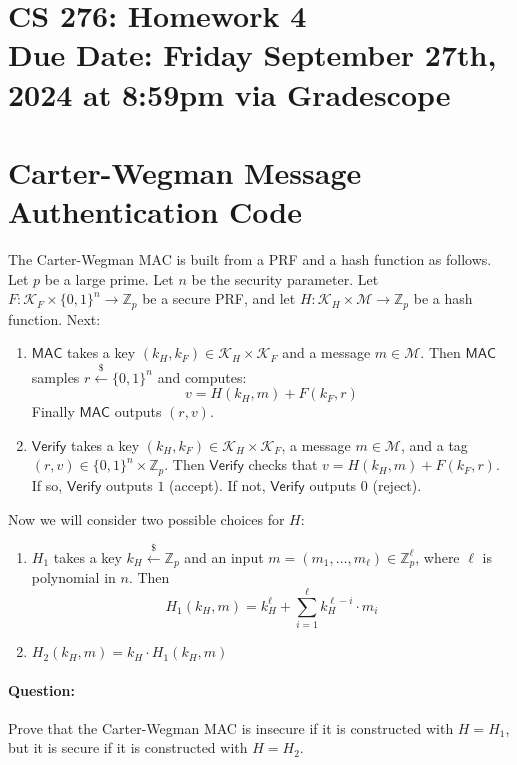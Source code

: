 \documentclass[11pt]{article}
\numberwithin{equation}{section}
\newcommand{\Verify}{\mathsf{Verify}}
\newcommand{\MAC}{\mathsf{MAC}}
\newcommand{\bbZ}{\mathbb{Z}}
\newcommand{\cK}{\mathcal{K}}
\newcommand{\cM}{\mathcal{M}}
\newcommand{\getsr}{\stackrel{\$}{\gets}}
\newcommand{\bin}{\{0,1\}}
\newcommand{\bit}{\bin}
\newcommand{\duedate}{Friday September 27th, 2024 at 8:59pm via Gradescope}
\begin{document}
\section*{CS 276: Homework 4\\ {\small Due Date: \duedate} }


\section{Carter-Wegman Message Authentication Code}

The Carter-Wegman MAC is built from a PRF and a hash function as follows. Let $p$ be a large prime. Let $n$ be the security parameter. Let $F: \cK_F \times \bit^n \to \bbZ_p$ be a secure PRF, and let $H:\cK_H \times \cM \to \bbZ_p$ be a hash function. Next:
\begin{enumerate}
    \item $\MAC$ takes a key $(k_H, k_F) \in \cK_H \times \cK_F$ and a message $m \in \cM$. Then $\MAC$ samples $r \getsr \bit^n$ and computes:
    \[v = H(k_H, m) + F(k_F, r)\]
    Finally $\MAC$ outputs $(r,v)$.
    \item $\Verify$ takes a key $(k_H, k_F) \in \cK_H \times \cK_F$, a message $m \in \cM$, and a tag $(r,v) \in \bit^n \times \bbZ_p$. Then $\Verify$ checks that $v = H(k_H, m) + F(k_F, r)$. If so, $\Verify$ outputs $1$ (accept). If not, $\Verify$ outputs $0$ (reject).
\end{enumerate}

Now we will consider two possible choices for $H$:
\begin{enumerate}
    \item $H_1$ takes a key $k_H \getsr \bbZ_p$ and an input $m = (m_1, \dots, m_\ell) \in \bbZ_p^\ell$, where $\ell$ is polynomial in $n$. Then
    \[H_1(k_H, m) = k_H^{\ell} + \sum_{i = 1}^\ell k_H^{\ell-i} \cdot m_i\]
    \item $H_2(k_H, m) = k_H \cdot H_1(k_H, m)$
\end{enumerate}

\paragraph{Question:} Prove that the Carter-Wegman MAC is insecure if it is constructed with $H = H_1$, but it is secure if it is constructed with $H = H_2$.\newline
\end{document}
